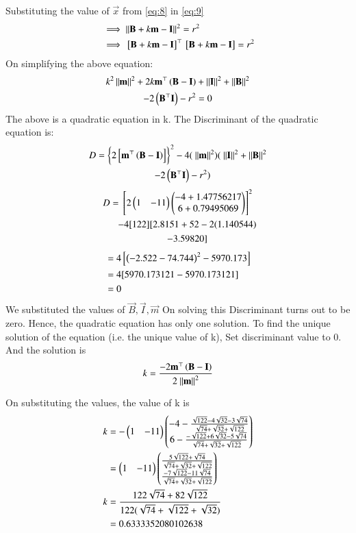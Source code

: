 \documentclass[journal,12pt,twocolumn]{IEEEtran}
\theoremstyle{remark}
\begin{document}
Substituting the value of $ \vec{x} $ from \eqref{eq:8} in \eqref{eq:9}
\begin{align}
  &\implies\left\lVert \mathbf{B} + k{\mathbf{m}}- \mathbf{I} \right\rVert^2 = r^2 \\
  &\implies{}\left[\mathbf{B} + k{\mathbf{m}}- \mathbf{I}\right]^{\top} {}\left[\mathbf{B} + k{\mathbf{m}}- \mathbf{I}\right] = r^2 
\end{align}
On simplifying the above equation:
\begin{multline}
k^2\left\lVert\mathbf{m}\right\rVert^2 +2k{\mathbf{m}^{\top}}\left({\mathbf{B}-\mathbf{I}}\right)+\left\lVert\mathbf{I}\right\rVert^2 +\left\lVert\mathbf{B}\right\rVert^2\\-2\left(\mathbf{B}^{\top}\mathbf{I}\right) - r^2=0
\end{multline}
The above is a quadratic equation in k.
The Discriminant of the quadratic equation is:
\begin{multline}
D = {\cbrak{2\sbrak{\vec{m}^{\top}\brak{\vec{B}-\vec{I}}}}}^2-4(\ \norm{\vec{m}}^2)(\ \norm{\vec{I}}^2 +\norm{\vec{B}}^2\\\quad-2\brak{\vec{B}^{\top}\vec{I}} - r^2)
\end{multline}
\begin{multline}
D = {{}\left[2\begin{pmatrix}1&-11\end{pmatrix}\begin{pmatrix}-4+1.47756217\\6+0.79495069\end{pmatrix}\right]}^2 \\\qquad-4[122][2.8151+52-2(1.140544)\\\qquad-3.59820]
\end{multline}
\begin{align}
&=4{}\left[{\left(-2.522-74.744\right)}^2-5970.173\right]\\
&=4[5970.173121-5970.173121]\\
&=0
\end{align}
We substituted the values of $\vec{B},\vec{I},\vec{m}$
On solving this Discriminant turns out to be zero.
Hence, the quadratic equation has only one solution.
To find the unique solution of the equation (i.e. the unique value of k), Set discriminant value to 0.
And the solution is \begin{align}k=\frac{-2\mathbf{m}^{\top}\left(\mathbf{B}-\mathbf{I}\right)}{2{\ \left\lVert\mathbf{m}\right\rVert^2}}\end{align}

On substituting the values, the value of k is 
\begin{align}
k&=-\begin{pmatrix}1&-11\end{pmatrix}\begin{pmatrix}-4-\frac{\sqrt{122}-4\sqrt{32}-3\sqrt{74}}{\sqrt{74}+\sqrt{32}+\sqrt{122}}\\6-\frac{-\sqrt{122}+6\sqrt{32}-5\sqrt{74}}{\sqrt{74}+\sqrt{32}+\sqrt{122}}\end{pmatrix}\\
&=\begin{pmatrix}1&-11\end{pmatrix}\begin{pmatrix}\frac{5\sqrt{122}+\sqrt{74}}{\sqrt{74}+\sqrt{32}+\sqrt{122}}\\\frac{-7\sqrt{122}-11\sqrt{74}}{\sqrt{74}+\sqrt{32}+\sqrt{122}}\end{pmatrix}\\
k&=\frac{122\sqrt{74}+82\sqrt{122}}{122(\sqrt{74}+\sqrt{122}+\sqrt{32})}\\
&=0.6333352080102638
\end{align}
\end{document}
